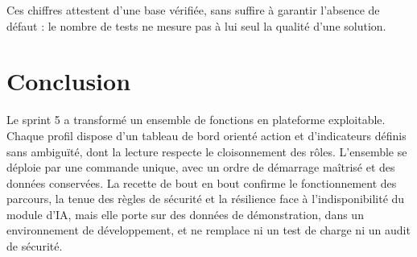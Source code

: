 Ces chiffres attestent d'une base vérifiée, sans suffire à garantir l'absence de défaut : le nombre de tests ne mesure pas à lui seul la qualité d'une solution.

\section{Conclusion}

Le sprint 5 a transformé un ensemble de fonctions en plateforme exploitable. Chaque profil dispose d'un tableau de bord orienté action et d'indicateurs définis sans ambiguïté, dont la lecture respecte le cloisonnement des rôles. L'ensemble se déploie par une commande unique, avec un ordre de démarrage maîtrisé et des données conservées. La recette de bout en bout confirme le fonctionnement des parcours, la tenue des règles de sécurité et la résilience face à l'indisponibilité du module d'IA, mais elle porte sur des données de démonstration, dans un environnement de développement, et ne remplace ni un test de charge ni un audit de sécurité.
